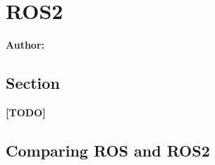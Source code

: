 \chapter{ROS2}

\textbf{Author: } 

\section{Section}
\textbf{[TODO]}
\newline
\lipsum[1]

\section{Comparing ROS and ROS2}

\filbreak